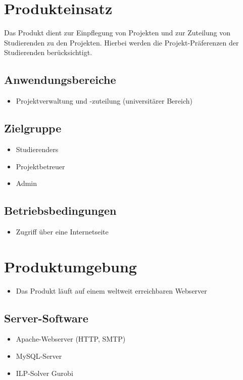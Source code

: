 \documentclass[parskip=full]{scrartcl}
\begin{document}
\section{Produkteinsatz}
Das Produkt dient zur Einpflegung von Projekten und zur Zuteilung von
Studierenden zu den Projekten. Hierbei werden die Projekt-Präferenzen der
Studierenden berücksichtigt.


\subsection{Anwendungsbereiche}

\begin{itemize} 
  \item Projektverwaltung und -zuteilung (universitärer Bereich) %
\end{itemize}

\subsection{Zielgruppe}
\begin{itemize} 
  \item \glspl{Studierender}
  \item \gls{Projektbetreuer}
  \item \gls{Admin}
\end{itemize}

\subsection{Betriebsbedingungen}
\begin{itemize} 
  \item Zugriff über eine Internetseite
\end{itemize}
\section{Produktumgebung}

\begin{itemize} 
  \item Das Produkt läuft auf einem weltweit erreichbaren Webserver
\end{itemize}
\subsection{Server-Software}
\begin{itemize} 
  \item Apache-Webserver (HTTP, SMTP)
  \item MySQL-Server
  \item ILP-Solver Gurobi %
\end{itemize}
\end{document}
